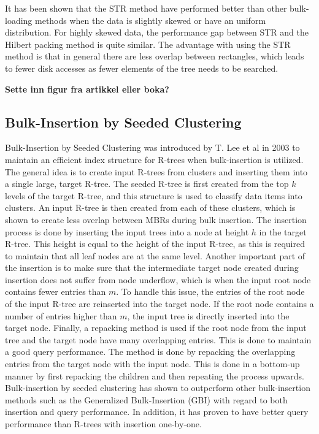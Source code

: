 It has been shown that the STR method have performed better than other bulk-loading methods when the data is slightly skewed or have an uniform distribution. For highly skewed data, the performance gap between STR and the Hilbert packing method is quite similar\cite{STR}. The advantage with using the STR method is that in general there are less overlap between rectangles, which leads to fewer disk accesses as fewer elements of the tree needs to be searched.

\textbf{Sette inn figur fra artikkel eller boka?}

\subsection{Bulk-Insertion by Seeded Clustering}

Bulk-Insertion by Seeded Clustering was introduced by T. Lee et al in 2003 to maintain an efficient index structure for R-trees when bulk-insertion is utilized\cite{SeededClustering}. The general idea is to create input R-trees from clusters and inserting them into a single large, target R-tree. The seeded R-tree is first created from the top $k$ levels of the target R-tree, and this structure is used to classify data items into clusters. An input R-tree is then created from each of these clusters, which is shown to create less overlap between MBRs during bulk insertion. The insertion process is done by inserting the input trees into a node at height $h$ in the target R-tree. This height is equal to the height of the input R-tree, as this is required to maintain that all leaf nodes are at the same level. Another important part of the insertion is to make sure that the intermediate target node created during insertion does not suffer from node underflow, which is when the input root node contains fewer entries than $m$. To handle this issue, the entries of the root node of the input R-tree are reinserted into the target node. If the root node contains a number of entries higher than $m$, the input tree is directly inserted into the target node. Finally, a repacking method is used if the root node from the input tree and the target node have many overlapping entries. This is done to maintain a good query performance. The method is done by repacking the overlapping entries from the target node with the input node. This is done in a bottom-up manner by first repacking the children and then repeating the process upwards. Bulk-insertion by seeded clustering has shown to outperform other bulk-insertion methods such as the Generalized Bulk-Insertion (GBI) with regard to both insertion and query performance. In addition, it has proven to have better query performance than R-trees with insertion one-by-one\cite{SeededClustering}.


